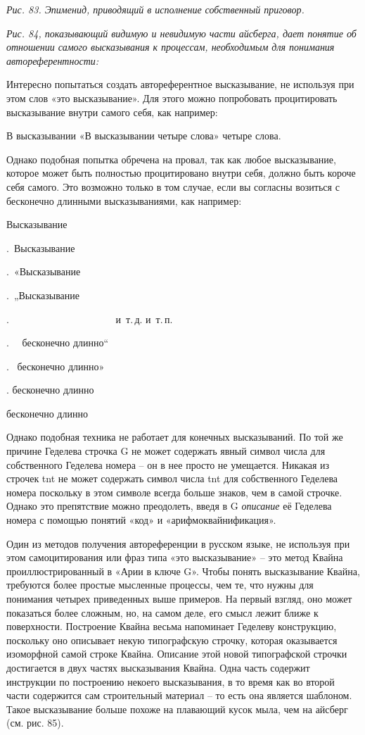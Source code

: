 \documentclass[../main.tex]{subfiles}
\begin{document}
\emph{Рис. 83. Эпименид, приводящий в исполнение собственный приговор.}

\emph{Рис. 84, показывающий видимую и невидимую части айсберга, дает понятие об отношении самого высказывания к процессам, необходимым для понимания автореферентности:}

Интересно попытаться создать автореферентное высказывание, не используя при этом слов «это высказывание». Для этого можно попробовать процитировать высказывание внутри самого себя, как например:

В высказывании «В высказывании четыре слова» четыре слова.

Однако подобная попытка обречена на провал, так как любое высказывание, которое может быть полностью процитировано внутри себя, должно быть короче себя самого. Это возможно только в том случае, если вы согласны возиться с бесконечно длинными высказываниями, как например:

Высказывание

.~Высказывание

.~«Высказывание

.~„Высказывание

.~~~~~~~~~~~~~~~~~~~~~ и~т.\,д. и~т.\,п.

.~~ бесконечно длинно``

.~ бесконечно длинно»

. бесконечно длинно

бесконечно длинно

Однако подобная техника не работает для конечных высказываний. По той же причине Геделева строчка G не может содержать явный символ числа для собственного Геделева номера \--- он в нее просто не умещается. Никакая из строчек \acs{tnt} не может содержать символ числа \acs{tnt} для собственного Геделева номера поскольку в этом символе всегда больше знаков, чем в самой строчке. Однако это препятствие можно преодолеть, введя в G \emph{описание} её Геделева номера с помощью понятий «код» и «арифмоквайнификация».

Один из методов получения автореференции в русском языке, не используя при этом самоцитирования или фраз типа «это высказывание» \--- это метод Квайна проиллюстрированный в «Арии в ключе G». Чтобы понять высказывание Квайна, требуются более простые мысленные процессы, чем те, что нужны для понимания четырех приведенных выше примеров. На первый взгляд, оно может показаться более сложным, но, на самом деле, его смысл лежит ближе к поверхности. Построение Квайна весьма напоминает Геделеву конструкцию, поскольку оно описывает некую типографскую строчку, которая оказывается изоморфной самой строке Квайна. Описание этой новой типографской строчки достигается в двух частях высказывания Квайна. Одна часть содержит инструкции по построению некоего высказывания, в то время как во второй части содержится сам строительный материал \--- то есть она является шаблоном. Такое высказывание больше похоже на плавающий кусок мыла, чем на айсберг (см. рис. 85).
\end{document}
